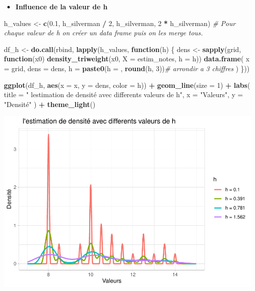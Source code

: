 \documentclass[
  12pt,
]{article}
\newenvironment{Shaded}{\begin{snugshade}}{\end{snugshade}}
\newcommand{\AttributeTok}[1]{\textcolor[rgb]{0.13,0.29,0.53}{#1}}
\newcommand{\CommentTok}[1]{\textcolor[rgb]{0.56,0.35,0.01}{\textit{#1}}}
\newcommand{\ControlFlowTok}[1]{\textcolor[rgb]{0.13,0.29,0.53}{\textbf{#1}}}
\newcommand{\DecValTok}[1]{\textcolor[rgb]{0.00,0.00,0.81}{#1}}
\newcommand{\FloatTok}[1]{\textcolor[rgb]{0.00,0.00,0.81}{#1}}
\newcommand{\FunctionTok}[1]{\textcolor[rgb]{0.13,0.29,0.53}{\textbf{#1}}}
\newcommand{\NormalTok}[1]{#1}
\newcommand{\OtherTok}[1]{\textcolor[rgb]{0.56,0.35,0.01}{#1}}
\newcommand{\SpecialCharTok}[1]{\textcolor[rgb]{0.81,0.36,0.00}{\textbf{#1}}}
\newcommand{\StringTok}[1]{\textcolor[rgb]{0.31,0.60,0.02}{#1}}
\providecommand{\tightlist}{%
  \setlength{\itemsep}{0pt}\setlength{\parskip}{0pt}}
\begin{document}
\begin{itemize}
\tightlist
\item
  \textbf{Influence de la valeur de h}
\end{itemize}

\begin{Shaded}
\begin{Highlighting}[]
\NormalTok{h\_values }\OtherTok{\textless{}{-}} \FunctionTok{c}\NormalTok{(}\FloatTok{0.1}\NormalTok{, h\_silverman }\SpecialCharTok{/} \DecValTok{2}\NormalTok{, h\_silverman, }\DecValTok{2} \SpecialCharTok{*}\NormalTok{ h\_silverman)}
\CommentTok{\# Pour chaque valeur de h on créer un data frame puis on les merge tous.}

\NormalTok{df\_h }\OtherTok{\textless{}{-}} \FunctionTok{do.call}\NormalTok{(rbind, }\FunctionTok{lapply}\NormalTok{(h\_values, }\ControlFlowTok{function}\NormalTok{(h) \{}
\NormalTok{  dens }\OtherTok{\textless{}{-}} \FunctionTok{sapply}\NormalTok{(grid, }\ControlFlowTok{function}\NormalTok{(x0) }\FunctionTok{density\_triweight}\NormalTok{(x0, }\AttributeTok{X =}\NormalTok{ estim\_notes, }\AttributeTok{h =}\NormalTok{ h))}
  \FunctionTok{data.frame}\NormalTok{(}
    \AttributeTok{x    =}\NormalTok{ grid,}
    \AttributeTok{dens =}\NormalTok{ dens,}
    \AttributeTok{h    =} \FunctionTok{paste0}\NormalTok{(}\StringTok{\textquotesingle{}h = \textquotesingle{}}\NormalTok{, }\FunctionTok{round}\NormalTok{(h, }\DecValTok{3}\NormalTok{))}\CommentTok{\# arrondir a 3 chiffres}
\NormalTok{  )}
\NormalTok{\}))}

\FunctionTok{ggplot}\NormalTok{(df\_h, }\FunctionTok{aes}\NormalTok{(}\AttributeTok{x =}\NormalTok{ x, }\AttributeTok{y =}\NormalTok{ dens, }\AttributeTok{color =}\NormalTok{ h)) }\SpecialCharTok{+}
  \FunctionTok{geom\_line}\NormalTok{(}\AttributeTok{size =} \DecValTok{1}\NormalTok{) }\SpecialCharTok{+}
  \FunctionTok{labs}\NormalTok{(}
    \AttributeTok{title =} \StringTok{"  l\textquotesingle{}estimation de densité avec differents valeurs de h"}\NormalTok{,}
    \AttributeTok{x =} \StringTok{"Valeurs"}\NormalTok{, }\AttributeTok{y =} \StringTok{"Densité"}
\NormalTok{  ) }\SpecialCharTok{+}
  \FunctionTok{theme\_light}\NormalTok{()}
\end{Highlighting}
\end{Shaded}

\includegraphics{Stat_non_para_files/figure-latex/unnamed-chunk-164-1.pdf}
\end{document}
